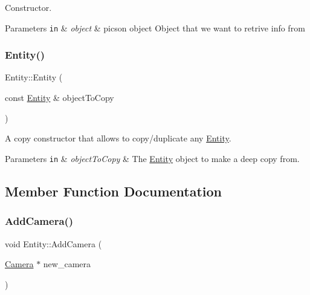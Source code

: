 Constructor. 


\begin{DoxyParams}[1]{Parameters}
\mbox{\tt in}  & {\em object} & picson object Object that we want to retrive info from \\
\hline
\end{DoxyParams}
\mbox{\label{classEntity_ad172cbc40deff00a36d76ab8dcf9a3c2}} 
\subsubsection{\texorpdfstring{Entity()}{Entity()}\hspace{0.1cm}{\footnotesize\ttfamily [2/2]}}
{\footnotesize\ttfamily Entity\+::\+Entity (\begin{DoxyParamCaption}\item[{const \hyperlink{classEntity}{Entity} \&}]{object\+To\+Copy }\end{DoxyParamCaption})\hspace{0.3cm}{\ttfamily [inline]}}



A copy constructor that allows to copy/duplicate any \hyperlink{classEntity}{Entity}. 


\begin{DoxyParams}[1]{Parameters}
\mbox{\tt in}  & {\em object\+To\+Copy} & The \hyperlink{classEntity}{Entity} object to make a deep copy from. \\
\hline
\end{DoxyParams}


\subsection{Member Function Documentation}
\mbox{\label{classEntity_a9f3c739a3ef623a9febc7801270ba719}} 
\subsubsection{\texorpdfstring{Add\+Camera()}{AddCamera()}}
{\footnotesize\ttfamily void Entity\+::\+Add\+Camera (\begin{DoxyParamCaption}\item[{\hyperlink{classCamera}{Camera} $\ast$}]{new\+\_\+camera }\end{DoxyParamCaption})\hspace{0.3cm}{\ttfamily [virtual]}}



